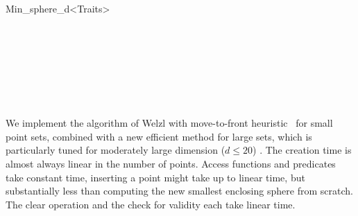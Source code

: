 \begin{ccRefClass}{Min_sphere_d<Traits>}
\begin{ccIndexGlobalFunctions}




\end{ccIndexGlobalFunctions}

\ccSeeAlso

    \\
    \\
    \\
    \\
    \\
    \\

\ccImplementation
\ccIndexImplementation

We implement the algorithm of Welzl with move-to-front
heuristic~\cite{w-sedbe-91a} for small point sets, combined with a new
efficient method for large sets, which is particularly tuned for
moderately large dimension ($d \leq 20$) \cite{cgal:g-frseb-99}.
The creation time is almost
always linear in the number of points. Access functions and predicates
take constant time, inserting a point might take up to linear time,
but substantially less than computing the new smallest enclosing
sphere from scratch. The clear operation and the check for validity
    each take linear time.

    \ccExample

\end{ccRefClass}


